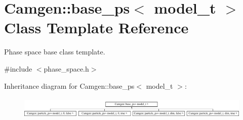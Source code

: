 \hypertarget{a00026}{\section{Camgen\-:\-:base\-\_\-ps$<$ model\-\_\-t $>$ Class Template Reference}
\label{a00026}
}


Phase space base class template.  




{\ttfamily \#include $<$phase\-\_\-space.\-h$>$}

Inheritance diagram for Camgen\-:\-:base\-\_\-ps$<$ model\-\_\-t $>$\-:\begin{figure}[H]
\begin{center}
\leavevmode
\includegraphics[height=1.056604cm]{a00026}
\end{center}
\end{figure}
